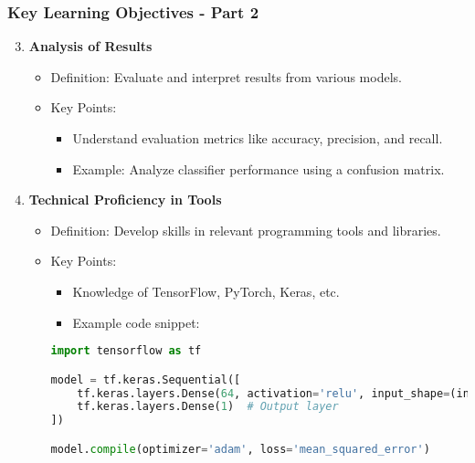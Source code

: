 \documentclass[aspectratio=169]{beamer}
\begin{document}
\begin{frame}[fragile]
    \frametitle{Key Learning Objectives - Part 2}
    \begin{enumerate}
        \setcounter{enumi}{2} %
        \item \textbf{Analysis of Results}
        \begin{itemize}
            \item Definition: Evaluate and interpret results from various models.
            \item Key Points:
            \begin{itemize}
                \item Understand evaluation metrics like accuracy, precision, and recall.
                \item Example: Analyze classifier performance using a confusion matrix.
            \end{itemize}
        \end{itemize}

        \item \textbf{Technical Proficiency in Tools}
        \begin{itemize}
            \item Definition: Develop skills in relevant programming tools and libraries.
            \item Key Points:
            \begin{itemize}
                \item Knowledge of TensorFlow, PyTorch, Keras, etc.
                \item Example code snippet:
                \end{itemize}
                \begin{lstlisting}[language=Python]
import tensorflow as tf

model = tf.keras.Sequential([
    tf.keras.layers.Dense(64, activation='relu', input_shape=(input_shape,)),
    tf.keras.layers.Dense(1)  # Output layer
])

model.compile(optimizer='adam', loss='mean_squared_error')
                \end{lstlisting}
        \end{itemize}
    \end{enumerate}
\end{frame}
\end{document}
